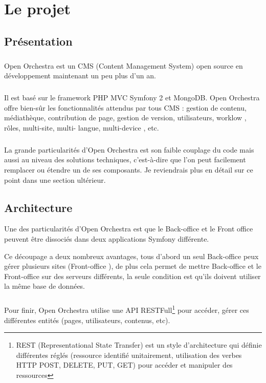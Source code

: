 \chapter{Le projet}
\section{Présentation}
        \paragraph{}
        Open Orchestra est un CMS (Content Management  System) open source en développement maintenant un peu plus d'un an. 
        \paragraph{}
        Il est basé sur le framework PHP MVC Symfony 2 et MongoDB. Open Orchestra offre bien-sûr les fonctionnalités attendus par tous CMS  : gestion de contenu, médiathèque, contribution de page, gestion de version, utilisateurs, \og worklow \fg{}, rôles,  multi-site, multi- langue,  multi-device , etc.
        \paragraph{}
        La grande particularités d'Open Orchestra est son faible couplage du code mais aussi au niveau des solutions techniques, c'est-à-dire que l'on peut facilement remplacer ou étendre un de ses composants. Je reviendrais plus en détail sur ce point dans une section ultérieur.
        
        \section{Architecture}
        Une des particularités d'Open Orchestra est que le \og Back-office \fg{} et le \og Front office \fg{} peuvent être dissociés dans deux applications Symfony différente. 

        Ce découpage a deux nombreux avantages, tous d'abord un seul \og Back-office \fg{}  peux gérer plusieurs sites (\og Front-office \fg{}), de plus cela permet de mettre \og Back-office \fg{} et le \og Front-office \fg{} sur des serveurs différents, la seule condition est qu'ils doivent utiliser la même base de données.
        \paragraph{}
		Pour finir, Open Orchestra utilise une API RESTFull\footnote{REST (Representational State Transfer) est un style d'architecture qui définie différentes réglés (ressource identifié unitairement, utilisation des verbes HTTP POST, DELETE, PUT, GET) pour accéder et manipuler des ressources } pour  accéder, gérer ces différentes entités (pages, utilisateurs, contenus, etc).
